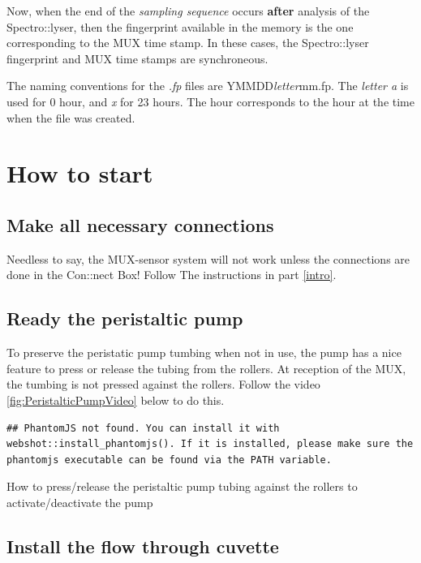 \documentclass[]{book}
\begin{document}
Now, when the end of the \emph{sampling sequence} occurs \textbf{after} analysis of the Spectro::lyser, then the fingerprint available in the memory is the one corresponding to the MUX time stamp. In these cases, the Spectro::lyser fingerprint and MUX time stamps are synchroneous.

The naming conventions for the \emph{.fp} files are YMMDD\emph{letter}mm.fp. The \emph{letter a} is used for 0 hour, and \emph{x} for 23 hours. The hour corresponds to the hour at the time when the file was created.

\hypertarget{how-to-start}{%
\chapter{How to start}\label{how-to-start}}

\hypertarget{make-all-necessary-connections}{%
\section{Make all necessary connections}\label{make-all-necessary-connections}}

Needless to say, the MUX-sensor system will not work unless the connections are done in the Con::nect Box! Follow The instructions in part \ref{intro}.

\hypertarget{ready-the-peristaltic-pump}{%
\section{Ready the peristaltic pump}\label{ready-the-peristaltic-pump}}

To preserve the peristatic pump tumbing when not in use, the pump has a nice feature to press or release the tubing from the rollers. At reception of the MUX, the tumbing is not pressed against the rollers. Follow the video \ref{fig:PeristalticPumpVideo} below to do this.

\begin{verbatim}
## PhantomJS not found. You can install it with webshot::install_phantomjs(). If it is installed, please make sure the phantomjs executable can be found via the PATH variable.
\end{verbatim}

\label{fig:PeristalticPumpVideo}How to press/release the peristaltic pump tubing against the rollers to activate/deactivate the pump

\hypertarget{install-the-flow-through-cuvette}{%
\section{Install the flow through cuvette}\label{install-the-flow-through-cuvette}}
\end{document}
